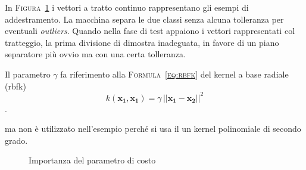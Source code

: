 In \textsc{Figura~\ref{fig:costo}} i vettori a tratto continuo
rappresentano gli esempi di addestramento.
La macchina separa le due classi senza alcuna tolleranza per eventuali \textit{outliers}.
Quando nella fase di test appaiono i vettori rappresentati col tratteggio, la prima divisione di dimostra inadeguata, in favore di un piano separatore più ovvio ma con una certa tolleranza.


Il parametro $\gamma$ fa riferimento alla \textsc{Formula~\ref{eq:rbfk}} del kernel a base radiale (\ac{rbfk})
\begin{equation}
  \label{eq:rbfk}
  k(\boldsymbol{x_1}, \boldsymbol{x_1}) = 
    \gamma\,||\boldsymbol{x_1}-\boldsymbol{x_2}||^2
\end{equation}.

ma non \`e utilizzato nell'esempio
perch\'e si usa il un kernel polinomiale di secondo grado.


\begin{figure}
\centering

\caption{Importanza del parametro di costo}
\label{fig:costo}
\end{figure}
